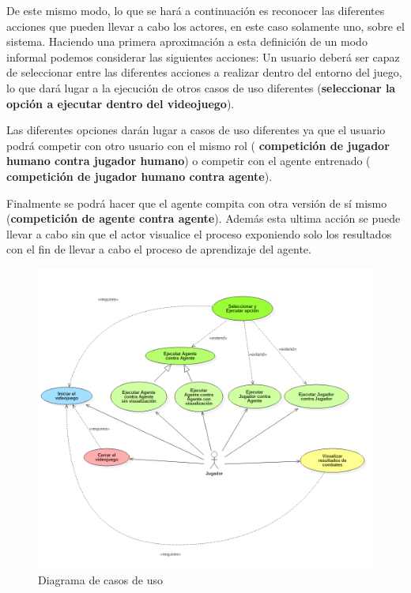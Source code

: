 \bigskip

De este mismo modo, lo que se hará a continuación es reconocer las diferentes acciones que pueden llevar a cabo los actores, en este caso solamente uno, sobre el sistema. Haciendo una primera aproximación a esta definición de un modo informal podemos considerar las siguientes acciones: Un usuario deberá ser capaz de seleccionar entre las diferentes acciones a realizar dentro del entorno del juego, lo que dará lugar a la ejecución de otros casos de uso diferentes (\textbf{seleccionar la opción a ejecutar dentro del videojuego}).

\bigskip

Las diferentes opciones darán lugar a casos de uso diferentes ya que el usuario podrá competir con otro usuario con el mismo rol (\textbf{ competición de jugador humano contra jugador humano}) o competir con el agente entrenado (\textbf{ competición de jugador humano contra agente}).

\bigskip

Finalmente se podrá hacer que el agente compita con otra versión de sí mismo (\textbf{competición de agente contra agente}). Además esta ultima acción se puede llevar a cabo sin que el actor visualice el proceso exponiendo solo los resultados con el fin de llevar a cabo el proceso de aprendizaje del agente.

\begin{figure}[h]
	\centerline{\includegraphics[width=20cm]{diagramas/casosDeUsoCropped.png}}
	\caption{Diagrama de casos de uso}
	\label{casos_de_uso}
\end{figure}

